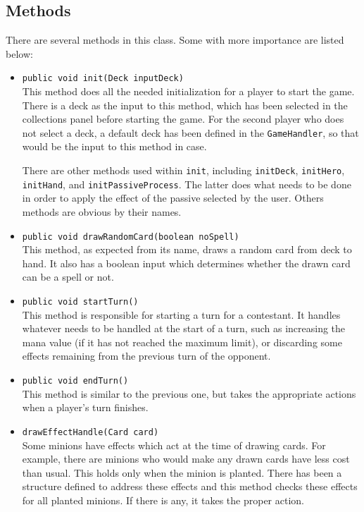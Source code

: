 \documentclass[a4paper]{article}
\begin{document}
\subsection{Methods}
There are several methods in this class. Some with more importance are listed below:
\begin{itemize}
	\item 
	\texttt{public void init(Deck inputDeck)}\\
	This method does all the needed initialization for a player to start the game. There is a deck as the input to this method, which has been selected in the collections panel before starting the game. For the second player who does not select a deck, a default deck has been defined in the \texttt{GameHandler}, so that would be the input to this method in case.
	
	There are other methods used within \texttt{init}, including \texttt{initDeck}, \texttt{initHero}, \texttt{initHand}, and \texttt{initPassiveProcess}. The latter does what needs to be done in order to apply the effect of the passive selected by the user. Others methods are obvious by their names.
	
	\item \texttt{public void drawRandomCard(boolean noSpell)}\\
	This method, as expected from its name, draws a random card from deck to hand. It also has a boolean input which determines whether the drawn card can be a spell or not.
	
	\item \texttt{public void startTurn()}\\
	This method is responsible for starting a turn for a contestant. It handles whatever needs to be handled at the start of a turn, such as increasing the mana value (if it has not reached the maximum limit), or discarding some effects remaining from the previous turn of the opponent.
	
	\item \texttt{public void endTurn()}\\
	This method is similar to the previous one, but takes the appropriate actions when a player's turn finishes.
	
	\item \texttt{drawEffectHandle(Card card)}\\
	Some minions have effects which act at the time of drawing cards. For example, there are minions who would make any drawn cards have less cost than usual. This holds only when the minion is planted. There has been a structure defined to address these effects and this method checks these effects for all planted minions. If there is any, it takes the proper action.
	

\end{itemize}
\end{document}
